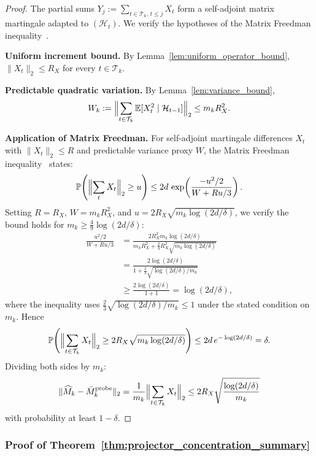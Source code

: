 \documentclass{article}
\newcommand{\E}{\mathbb{E}}
\newcommand{\Prob}{\mathbb{P}}
\newcommand{\cH}{\mathcal{H}}
\newcommand{\cT}{\mathcal{T}}
\begin{document}
\begin{proof}
The partial sums $Y_j := \sum_{t \in \cT_k,\, t \le j} X_t$ form a self-adjoint matrix martingale adapted to $(\cH_t)$.  We verify the hypotheses of the Matrix Freedman inequality~\citep{tropp2012user}.

\textbf{Uniform increment bound.}
By Lemma~\ref{lem:uniform_operator_bound}, $\|X_t\|_2 \le R_X$ for every $t \in \cT_k$.

\textbf{Predictable quadratic variation.}
By Lemma~\ref{lem:variance_bound},
\[
W_k := \Bigl\|\sum_{t \in \cT_k} \E[X_t^2 \mid \cH_{t-1}]\Bigr\|_2 \le m_k R_X^2.
\]

\textbf{Application of Matrix Freedman.}
For self-adjoint martingale differences $X_t$ with $\|X_t\|_2 \le R$ and predictable variance proxy $W$, the Matrix Freedman inequality~\citep[Theorem~1.6]{tropp2012user} states:
\[
\Prob\!\left(\Bigl\|\sum_{t} X_t\Bigr\|_2 \ge u\right) \le 2d\,\exp\!\left(\frac{-u^2/2}{W + Ru/3}\right).
\]
Setting $R = R_X$, $W = m_k R_X^2$, and $u = 2R_X\sqrt{m_k\log(2d/\delta)}$, we verify the bound holds for $m_k \ge \tfrac{4}{9}\log(2d/\delta)$:
\begin{align*}
\frac{u^2/2}{W + Ru/3}
&= \frac{2R_X^2 m_k \log(2d/\delta)}{m_k R_X^2 + \tfrac{2}{3}R_X^2\sqrt{m_k\log(2d/\delta)}} \\
&= \frac{2\log(2d/\delta)}{1 + \tfrac{2}{3}\sqrt{\log(2d/\delta)/m_k}} \\
&\ge \frac{2\log(2d/\delta)}{1+1} = \log(2d/\delta),
\end{align*}
where the inequality uses $\tfrac{2}{3}\sqrt{\log(2d/\delta)/m_k} \le 1$ under the stated condition on $m_k$.  Hence
\[
\Prob\!\left(\Bigl\|\sum_{t \in \cT_k} X_t\Bigr\|_2 \ge 2R_X\sqrt{m_k\log(2d/\delta)}\right)
\le 2d\,e^{-\log(2d/\delta)} = \delta.
\]
Dividing both sides by $m_k$:
\[
\|\widehat M_k - \bar M_k^{\mathrm{probe}}\|_2
= \frac{1}{m_k}\Bigl\|\sum_{t \in \cT_k} X_t\Bigr\|_2
\le 2R_X\sqrt{\frac{\log(2d/\delta)}{m_k}}
\]
with probability at least $1-\delta$.
\end{proof}

\subsubsection{Proof of Theorem~\ref{thm:projector_concentration_summary}}
\label{proof:projector_concentration}
\end{document}
